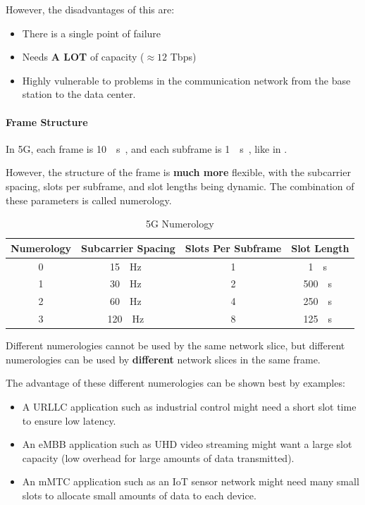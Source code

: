 However, the disadvantages of this are:
\begin{itemize}[noitemsep]
\item There is a single point of failure
\item Needs \textbf{A LOT} of capacity ($\approx 12$ Tbps)
\item Highly vulnerable to problems in the communication network from the base station to the data center.
\end{itemize}

\paragraph{Frame Structure}\label{par:Frame_Structure}
In 5G, each frame is \SI{10}{\milli{} \second{}}, and each subframe is \SI{1}{\milli{} \second{}}, like in .

However, the structure of the frame is \textbf{much more} flexible, with the subcarrier spacing, slots per subframe, and slot lengths being dynamic.
The combination of these parameters is called numerology.

\begin{table}[h!tbp]
  \centering
  \begin{tabular}{cccc}
    \toprule
    \textbf{Numerology} & \textbf{Subcarrier Spacing} & \textbf{Slots Per Subframe} & \textbf{Slot Length} \\
    \midrule
    0 & \SI{15}{\kilo{} \hertz{}} & 1 & \SI{1}{\milli{} \second{}} \\
    1 & \SI{30}{\kilo{} \hertz{}} & 2 & \SI{500}{\micro{} \second{}} \\
    2 & \SI{60}{\kilo{} \hertz{}} & 4 & \SI{250}{\micro{} \second{}} \\
    3 & \SI{120}{\kilo{} \hertz{}} & 8 & \SI{125}{\micro{} \second{}} \\
    \bottomrule
  \end{tabular}
  \caption{5G Numerology}
  \label{tab:5G_Numerology}
\end{table}

\begin{remark*}
  Different numerologies cannot be used by the same network slice, but different numerologies can be used by \textbf{different} network slices in the same frame.
\end{remark*}

The advantage of these different numerologies can be shown best by examples:
\begin{itemize}[noitemsep]
\item A URLLC application such as industrial control might need a short slot time to ensure low latency.
\item An eMBB application such as UHD video streaming might want a large slot capacity (low overhead for large amounts of data transmitted).
\item An mMTC application such as an IoT sensor network might need many small slots to allocate small amounts of data to each device.
\end{itemize}


